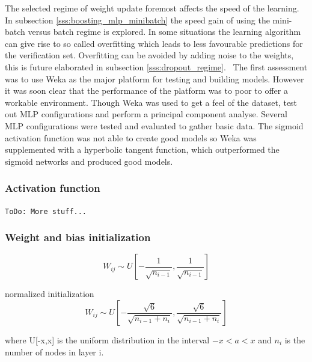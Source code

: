 The selected regime of weight update foremost affects the speed of the learning. In subsection \ref{sss:boosting_mlp_minibatch} the speed gain of using the mini-batch versus batch regime is explored. In some situations the learning algorithm can give rise to so called overfitting which leads to less favourable predictions for the verification set. Overfitting can be avoided by adding noise to the weights, this is future elaborated in subsection \ref{sss:dropout_regime}.
\
The first assessment was to use Weka as the major platform for testing and building models. However it was soon clear that the performance of the platform was to poor to offer a workable environment. Though Weka was used to get a feel of the dataset, test out MLP configurations and perform a principal component analyse. Several MLP configurations were tested and evaluated to gather basic data. The sigmoid activation function was not able to create good models so Weka was supplemented with a hyperbolic tangent function, which outperformed the sigmoid networks and produced good models.  

\subsubsection{Activation function} \label{sss:activation_function}
\texttt{ToDo: More stuff...}


\subsubsection{Weight and bias initialization} \label{sss:weight_bias_initialization}

\begin{equation} \label{eq:weight_init_regular}
W_{ij} \sim U[-\frac{1}{\sqrt{n_{i-1}}},\frac{1}{\sqrt{n_{i-1}}}]
\end{equation}

normalized initialization
\begin{equation} \label{eq:weight_init_normalized}
W_{ij} \sim U[-\frac{\sqrt{6}}{\sqrt{n_{i-1}+n_{i}}},\frac{\sqrt{6}}{\sqrt{n_{i-1}+n_{i}}}]
\end{equation}

where U[-x,x] is the uniform distribution in the interval $-x < a < x$ and $n_{i}$ is the number of nodes in layer i.

